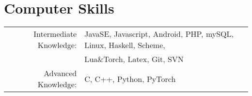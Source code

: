 \documentclass[a4paper,10pt]{article} %
\begin{document}

\section{Computer Skills}

\begin{tabular}{rl}

Intermediate Knowledge: & JavaSE, Javascript, Android, PHP, mySQL, Linux, Haskell, Scheme,\\
& Lua\&Torch, Latex, Git, SVN\\ 
Advanced Knowledge: & C, C++, Python, PyTorch\\
\end{tabular}


\end{document}
